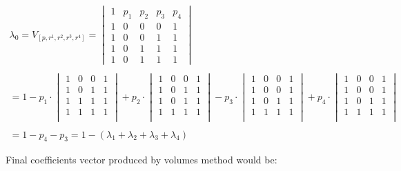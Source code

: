 	\begin{equation} 
	\begin{align*}		
	\label{eq1}

	\lambda_0 =	V_{[p,r^1,r^2,r^3,r^4]} = 
	\begin{vmatrix}
		1 & p_{1} &  p_{2}& p_{3} & p_{4}\\
		1 & 0 & 0 & 0 & 1\\ 
		1 & 0 & 0 & 1 & 1\\ 
		1 &  0  & 1 & 1 & 1 \\ 
		1 & 0 & 1 & 1 & 1
	\end{vmatrix} 
	\\ \\
		= 1 - p_1 \cdot \begin{vmatrix} 1 & 0 & 0 & 1 \\ 1 & 0 & 1 & 1 \\ 1 & 1 & 1 & 1 \\ 1 & 1 & 1 & 1 \\ \end{vmatrix} + 
		p_2 \cdot \begin{vmatrix} 1 & 0 & 0 & 1 \\ 1 & 0 & 1 & 1 \\ 1 & 0 & 1 & 1 \\ 1 & 1 & 1 & 1 \\ \end{vmatrix} - 
		p_3 \cdot \begin{vmatrix} 1 & 0 & 0 & 1 \\ 1 & 0 & 0 & 1 \\ 1 & 0 & 1 & 1 \\ 1 & 1 & 1 & 1 \\ \end{vmatrix} + 
		p_4 \cdot \begin{vmatrix} 1 & 0 & 0 & 1 \\ 1 & 0 & 0 & 1 \\ 1 & 0 & 1 & 1 \\ 1 & 1 & 1 & 1 \\ \end{vmatrix} \\ \\ 
		= 1 - p_4 - p_3 = 1 - (\lambda_1 + \lambda_2 + \lambda_3 + \lambda_4)

	\end{align*}	
	\end{equation}
	
		Final coefficients vector produced by volumes method would be:
		
